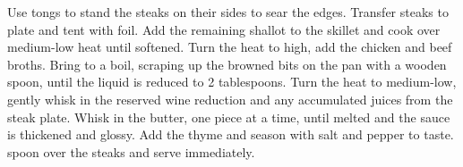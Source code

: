 \begin{recipe}
{    \step Use tongs to stand the steaks on their sides to sear the edges.
    \step Transfer steaks to plate and tent with foil.
    \step Add the remaining shallot to the skillet and cook over medium-low heat until
          softened.
    \step Turn the heat to high, add the chicken and beef broths. Bring to a boil,
          scraping up the browned bits on the pan with a wooden spoon, until the liquid
          is reduced to 2 tablespoons.
    \step Turn the heat to medium-low, gently whisk in the reserved wine reduction and
          any accumulated juices from the steak plate.
    \step Whisk in the butter, one piece at a time, until melted and the sauce is
          thickened and glossy.
    \step Add the thyme and season with salt and pepper to taste.
    \step spoon over the steaks and serve immediately.
  }
\end{recipe}
